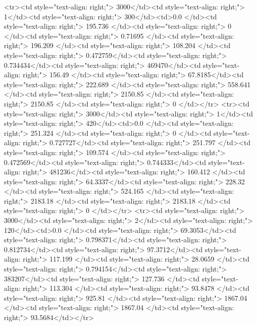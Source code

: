 <tr><td style="text-align: right;">      3000</td><td style="text-align: right;">         1</td><td style="text-align: right;">           300</td><td>0.0          </td><td style="text-align: right;">               195.736 </td><td style="text-align: right;">           0       </td><td style="text-align: right;">         0.71695 </td><td style="text-align: right;">        196.209 </td><td style="text-align: right;">           108.204 </td><td style="text-align: right;">               0.472759</td><td style="text-align: right;">             0.734434</td><td style="text-align: right;">              469470</td><td style="text-align: right;">                      156.49  </td><td style="text-align: right;">            67.8185</td><td style="text-align: right;">               222.689  </td><td style="text-align: right;">       558.641 </td><td style="text-align: right;">   2150.85 </td><td style="text-align: right;">      2150.85 </td><td style="text-align: right;">                  0     </td></tr>
<tr><td style="text-align: right;">      3000</td><td style="text-align: right;">         1</td><td style="text-align: right;">           420</td><td>0.0          </td><td style="text-align: right;">               251.324 </td><td style="text-align: right;">           0       </td><td style="text-align: right;">         0.727727</td><td style="text-align: right;">        251.797 </td><td style="text-align: right;">           109.574 </td><td style="text-align: right;">               0.472569</td><td style="text-align: right;">             0.744333</td><td style="text-align: right;">              481236</td><td style="text-align: right;">                      160.412 </td><td style="text-align: right;">            64.3337</td><td style="text-align: right;">               228.32   </td><td style="text-align: right;">       524.165 </td><td style="text-align: right;">   2183.18 </td><td style="text-align: right;">      2183.18 </td><td style="text-align: right;">                  0     </td></tr>
<tr><td style="text-align: right;">      3000</td><td style="text-align: right;">         2</td><td style="text-align: right;">           120</td><td>0.0          </td><td style="text-align: right;">                69.3053</td><td style="text-align: right;">           0.798371</td><td style="text-align: right;">         0.812734</td><td style="text-align: right;">         97.3712</td><td style="text-align: right;">           117.199 </td><td style="text-align: right;">              28.0659  </td><td style="text-align: right;">             0.794154</td><td style="text-align: right;">              383207</td><td style="text-align: right;">                      127.736 </td><td style="text-align: right;">           113.304 </td><td style="text-align: right;">                93.8478 </td><td style="text-align: right;">       925.81  </td><td style="text-align: right;">   1867.04 </td><td style="text-align: right;">      1867.04 </td><td style="text-align: right;">                 93.5684</td></tr>
